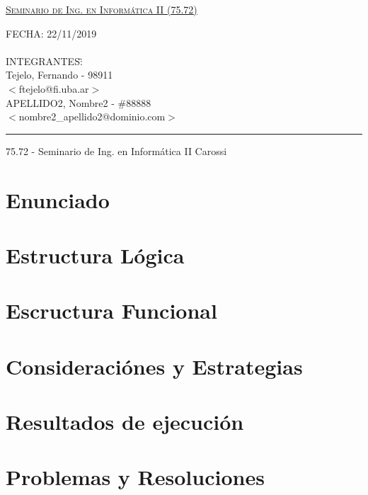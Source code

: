 \documentclass[12pt]{article}
\numberwithin{equation}{section}
\numberwithin{figure}{section}
\numberwithin{table}{section}
\begin{document}
\begin{titlepage}
\vfill

\begin{center}
\Large{\underline{\textsc{Seminario de Ing. en Informática II (75.72)}}}
\end{center}

\vfill

\begin{tabbing}
	FECHA: 22/11/2019
	\\
    \\
	INTEGRANTES:\hspace{-1cm}\=\+\hspace{1cm}\=\hspace{6cm}\=\\
		Tejelo, Fernando	\>\>- 98911\\
			\>\footnotesize{$<$ftejelo@fi.uba.ar$>$}\\
		APELLIDO2, Nombre2	\>\>- \#88888\\
			\>\footnotesize{$<$nombre2\_apellido2@dominio.com$>$}\\
\end{tabbing}

\vfill

\hrule
\vspace{0.2cm}

\noindent\small{75.72 - Seminario de Ing. en Informática II \hfill Carossi}

\end{titlepage}

%
%
\setcounter{page}{1}

%
%
\tableofcontents
\newpage

%
%
\section{Enunciado}
\pagebreak
\section{Estructura Lógica}
\pagebreak
\section{Escructura Funcional}
\pagebreak
\section{Consideraciónes y Estrategias}
\pagebreak
\section{Resultados de ejecución}
\pagebreak
\section{Problemas y Resoluciones}
\pagebreak
\end{document}
